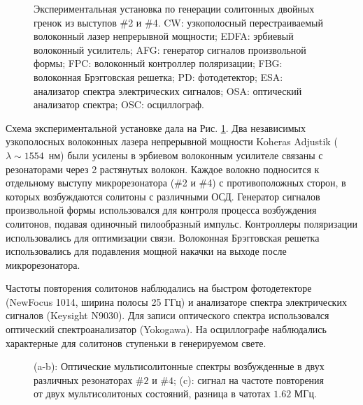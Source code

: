 \begin{figure}[ht]
\begin{minipage}[ht]{1\linewidth}
\end{minipage}
\caption{Экспериментальная установка по генерации солитонных двойных гренок из выступов \#2 и \#4. CW: узкополосный перестраиваемый волоконный лазер непрерывной мощности; EDFA: эрбиевый волоконный усилитель; AFG: генератор сигналов произвольной формы; FPC:  волоконный контроллер поляризации; FBG: волоконная Брэгговская решетка; PD: фотодетектор; ESA: анализатор спектра электрических сигналов; OSA: оптический анализатор спектра; OSC: осциллограф.}
\label{ris:image2}
\end{figure}

Схема экспериментальной установке дала на Рис. \ref{ris:image2}.  Два независимых узкополосных волоконных лазера непрерывной мощности Koheras Adjustik ($\lambda \sim 1554$~нм) были усилены в эрбиевом волоконным усилителе связаны с резонаторами через 2 растянутых волокон. Каждое волокно подносится к отдельному выступу микрорезонатора (\#2 и \#4) с противоположных сторон, в которых возбуждаются солитоны с различными ОСД. Генератор сигналов произвольной формы использовался для контроля процесса возбуждения солитонов, подавая одиночный пилообразный импульс. Контроллеры поляризации использовались для оптимизации связи. Волоконная Брэгговская решетка использовались для подавления мощной накачки на выходе после микрорезонатора.

Частоты повторения солитонов наблюдались на быстром фотодетекторе (NewFocus 1014, ширина полосы 25 ГГц) и анализаторе спектра электрических сигналов (Keysight N9030). Для записи оптического спектра использовался оптический спектроанализатор (Yokogawa). На осциллографе наблюдались характерные для солитонов ступеньки в генерируемом свете.

\begin{figure}[ht]
\begin{minipage}[ht]{1\linewidth}
\end{minipage}
\caption{(a-b): Оптические мультисолитонные спектры возбужденные в двух различных резонаторах $\#2$ и $\#4$; (c): сигнал на частоте повторения от двух мультисолитоных состояний, разница в чатотах $1.62$ МГц.}
\label{ris:image3}
\end{figure}


